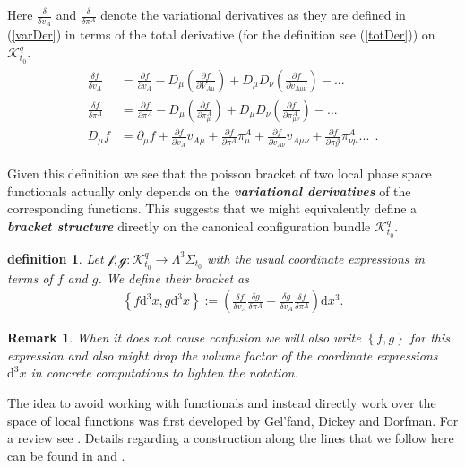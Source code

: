 \documentclass[a4paper,12pt, DIV=14, BCOR=5mm, twoside, headsepline]{scrbook}
\newtheorem{definition}{definition}[section]
\newtheorem*{remark}{Remark}
\begin{document}
Here $\frac{\delta}{\delta v_A}$ and $\frac{\delta}{\delta \pi^A}$ denote the variational derivatives as they are defined in (\ref{varDer}) in terms of the total derivative (for the definition see (\ref{totDer})) on $\mathcal{K}^q_{t_0}$.
%
%
%
\begin{align}
    \begin{aligned}
    \frac{\delta f}{\delta v_A} &= \frac{\partial f}{\partial v_A} - D_{\mu}(\frac{\partial f}{\partial V_{A\mu}}) + D_{\mu}D_{\nu} (\frac{\partial f}{\partial v_{A\mu\nu}}) - ... \\
    \frac{\delta f}{\delta \pi^A} &= \frac{\partial f}{\partial \pi^A} - D_{\mu}(\frac{\partial f}{\partial \pi^{A}_{\mu}}) + D_{\mu}D_{\nu} (\frac{\partial f}{\partial \pi^{A}_{\mu\nu}}) - ... \\
    D_\mu f &= \partial _\mu f + \frac{\partial f}{\partial v_A} v_{A\mu} + \frac{\partial f}{\partial \pi^A } \pi ^{A}_{ \mu} + \frac{\partial f}{\partial v_{A\nu}} v_{A\mu \nu} + \frac{\partial f}{\partial \pi^{A}_ {\nu}}\pi^{A}_{ \nu \mu} ... \ \ .
    \end{aligned}
\end{align}

Given this definition we see that the poisson bracket of two local phase space functionals actually only depends on the \textit{\textbf{variational derivatives}} of the corresponding functions. This suggests that we might equivalently define a \textit{\textbf{bracket structure}} directly on the canonical configuration bundle $\mathcal{K}^q_{t_0}$.
\begin{definition}
Let $\mathcal{f},\mathcal{g} : \mathcal{K}^q_{t_0} \rightarrow \Lambda^3\Sigma_{t_0} $ with the usual coordinate expressions in terms of $f$ and $g$. We define their bracket as 
\begin{align}
    \left \{ f \mathrm{d}^3x,g\mathrm{d}^3x\right \} := \left ( \frac{\delta f}{\delta v_A} \frac{\delta g}{\delta \pi^A} - \frac{\delta g}{\delta v_A} \frac{\delta f}{\delta \pi^A} \right ) \mathrm{d}x^3  .
\end{align}
\end{definition}
\begin{remark}
When it does not cause confusion we will also write $\left \{ f ,g\right \}$ for this expression and also might drop the volume factor of the coordinate expressions $\mathrm{d}^3x$ in concrete computations to lighten the notation. 
\end{remark}
The idea to avoid working with functionals and instead directly work over the space of local functions was first developed by Gel'fand, Dickey and Dorfman. For a review see \cite{doi:10.1142/5108}.
Details regarding a construction along the lines that we follow here can be found in \cite{1997hep.th....9164B} and \cite{Barnich1998}. 
\end{document}
